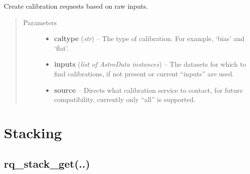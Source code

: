 \documentclass[letterpaper,10pt,english]{sphinxmanual}
\begin{document}
\begin{fulllineitems}
\label{chapter_ReductionContextClass:astrodata.RecipeManager.ReductionContext.rq_cal}
Create calibration requests based on raw inputs.
\begin{quote}\begin{description}
\item[{Parameters}] \leavevmode\begin{itemize}
\item {} 
\textbf{caltype} (\emph{str}) -- The type of calibration. For example, `bias' and `flat'.

\item {} 
\textbf{inputs} (\emph{list of AstroData instances}) -- The datasets for which to find calibrations, if not present
or  current ``inputs'' are used.

\item {} 
\textbf{source} -- Directs what calibration service to contact, for future
compatibility, currently only ``all'' is supported.

\end{itemize}

\end{description}\end{quote}

\end{fulllineitems}



\section{Stacking}
\label{chapter_ReductionContextClass:stacking}

\subsection{rq\_stack\_get(..)}
\label{chapter_ReductionContextClass:rq-stack-get}
\end{document}
